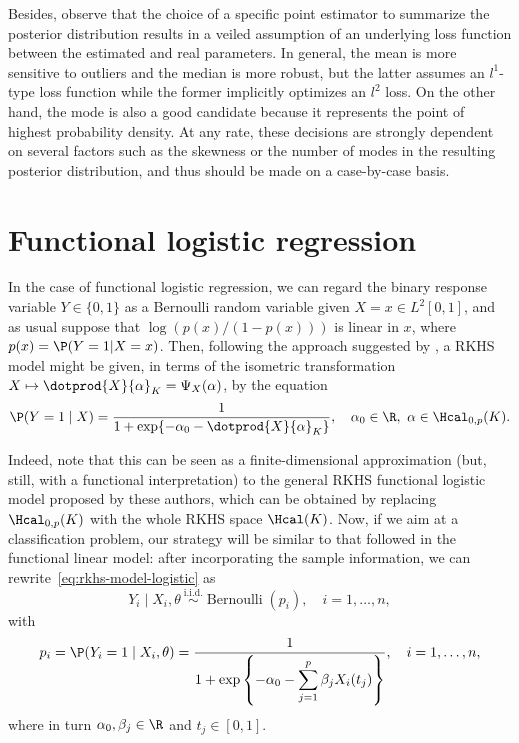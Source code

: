 Besides, observe that the choice of a specific point estimator to summarize the posterior distribution results in a veiled assumption of an underlying loss function between the estimated and real parameters. In general, the mean is more sensitive to outliers and the median is more robust, but the latter assumes an \(l^1\)-type loss function while the former implicitly optimizes an \(l^2\) loss. On the other hand, the mode is also a good candidate because it represents the point of highest probability density. At any rate, these decisions are strongly dependent on several factors such as the skewness or the number of modes in the resulting posterior distribution, and thus should be made on a case-by-case basis.

\newpage

\section{Functional logistic regression}\label{sec:rkhs-logistic-model}

In the case of functional logistic regression, we can regard the binary response variable \(Y\in\{0, 1\}\) as a Bernoulli random variable given \(X=x \in L^2[0, 1]\), and as usual suppose that \(\log\left(p(x)/(1-p(x))\right)\) is linear in \(x\), where \(p(x)=\P(Y=1| X=x)\). Then, following the approach  suggested by \citet{berrendero2018functional}, a RKHS model might be given, in terms of the isometric transformation \(X \mapsto \dotprod{X}{\alpha}_K = \Psi_X(\alpha)\), by the equation
\begin{equation}\label{eq:rkhs-model-logistic}
  \P(Y=1 \mid X) = \frac{1}{1 + \exp\{-\alpha_0 - \dotprod{X}{\alpha}_K\}}, \quad \alpha_0 \in \R, \ \alpha \in \Hcal_{0,p}(K).
\end{equation}

Indeed, note that this can be seen as a finite-dimensional approximation (but, still, with a functional interpretation) to the general RKHS functional logistic model proposed by these authors, which can be obtained by replacing \(\Hcal_{0,p}(K)\) with the whole RKHS space \(\Hcal(K)\). Now, if we aim at a classification problem, our strategy will be similar to that followed in the functional linear model: after incorporating the sample information, we can rewrite~\eqref{eq:rkhs-model-logistic} as
\begin{equation}\label{eq:rkhs-model-logistic-2}
Y_i \mid X_i,\theta \ \stackrel{\text{i.i.d.}}{\sim} \operatorname{Bernoulli}(p_i), \quad i=1,\dots, n,
\end{equation}
with
\begin{equation}\label{eq:rkhs-model-logistic-2-parameter}
  p_i = \P(Y_i=1 \mid X_i,\theta) = \frac{1}{\displaystyle 1 + \exp\left\{-\alpha_0 - \sum_{j=1}^p \beta_j X_i(t_j)\right\}}, \quad i=1,\dots, n,
\end{equation}
where in turn \(\alpha_0, \beta_j\in\R\) and \(t_j\in[0, 1]\).

